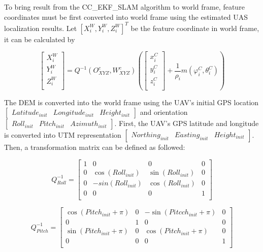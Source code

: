 To bring result from the CC\_EKF\_SLAM algorithm to world frame, feature
coordinates must be first converted into world frame using the
estimated UAS localization results. Let $[X_i^W,Y_i^W, Z_i^W]^T$ be
the feature coordinate in world frame, it can be calculated by

\begin{equation}
  \left[ \begin{array}{c}
    X_{i}^{W}  \\
    Y_{i}^{W}  \\
    Z_{i}^{W}  \\
  \end{array} \right]=Q^{-1}(O_{XYZ}^{c}, W_{XYZ}^{c})\left(\left[
    \begin{array}{c}
      x_{i}^{C} \\
      y_{i}^{C} \\
      z_{i}^{C} \\
    \end{array}
  \right]+\frac{1}{\rho _{i}}m(\varphi _{i}^{C},\theta_{i}^{C})\right)
\end{equation}

The DEM is converted into the world frame using the UAV's initial GPS
location $[\begin{matrix} Latitude_{init} & Longitude_{init} &
  Height_{init} \end{matrix}]$ and orientation $[\begin{matrix}
  Roll_{init} & Pitch_{init } & Azimuth_{init} \end{matrix}]$. First,
the UAV's GPS latitude and longitude is converted into UTM
representation $[\begin{matrix} Northing_{init} & Easting_{init} &
  Height_{init} \end{matrix}]$. Then, a transformation matrix can be
defined as followed:


\begin{equation}
Q_{Roll}^{-1}=\begin{bmatrix}
1 & 0 & 0 & 0 \\
0 & \cos (Roll_{init}) & \sin (Roll_{init}) & 0 \\
0 & -sin(Roll_{init}) & \cos (Roll_{init}) & 0 \\
0 & 0 & 0 & 1 \\
\end{bmatrix}
\end{equation}


\begin{equation}
Q_{Pitch}^{-1}=\begin{bmatrix}
\cos (Pitch_{init}+\pi ) & 0 & -\sin (Pitcch_{init}+\pi ) & 0 \\
0 & 1 & 0 & 0 \\
\sin (Pitch_{init}+\pi ) & 0 & \cos (Pitch_{init}+\pi ) & 0 \\
0 & 0 & 0 & 1 \\
\end{bmatrix}
\end{equation}

